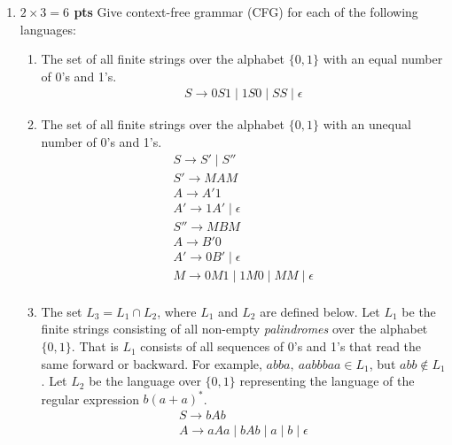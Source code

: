 \documentclass[10pt]{article}
\newcommand {\pts}[1]{{\bf #1 pts}}
\begin{document}
\begin{enumerate}
  \item  \pts{$2\times 3= 6$} Give context-free grammar (CFG) for each of the following languages:
  \begin{enumerate}
           \item The set of all finite strings over the alphabet $\{0,1\}$ with an equal number of 0's and 1's.
            \[\begin{array}{cll}
                  S \rightarrow 0S1 \mid 1S0 \mid SS \mid \epsilon
            \end{array}\]
           \item The set of all finite strings over the alphabet $\{0,1\}$ with an unequal number of 0's and 1's.
            \[\begin{array}{cll}
                  S \rightarrow S' \mid S'' \\
                  S' \rightarrow MAM \\
                  A  \rightarrow A'1 \\
                  A' \rightarrow 1A' \mid \epsilon \\
                  S'' \rightarrow MBM \\
                  A  \rightarrow B'0 \\
                  A' \rightarrow 0B' \mid \epsilon \\
                  M \rightarrow 0M1 \mid 1M0 \mid MM \mid \epsilon \\
            \end{array}\]
           \item The set $L_3=L_1\cap L_2$, where $L_1$ and $L_2$ are defined below. 
           Let $L_1$ be the finite strings consisting of all non-empty \emph{palindromes} over the alphabet $\{0,1\}$. That is $L_1$ 
           consists of all sequences of 0's and 1's that read the same forward or backward. For example, $abba,~aabbbaa\in L_1$, but $abb\not\in L_1$.
           Let $L_2$ be the language over  $\{0,1\}$ representing the language of the regular expression $b(a+a)^\ast$. 
            \[\begin{array}{cll}

                  S  \rightarrow  bAb  \\
                  A  \rightarrow  aAa \mid bAb \mid a \mid b \mid \epsilon \\ \\
                  


\end{array}\]
\end{enumerate}
\end{enumerate}
\end{document}

